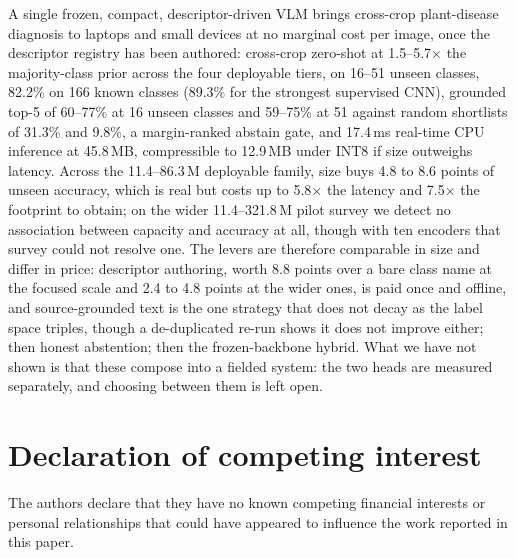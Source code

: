 \documentclass[a4paper,fleqn]{cas-dc}
\begin{document}
A single frozen, compact, descriptor-driven VLM brings cross-crop plant-disease diagnosis to laptops
and small devices at no marginal cost per image, once the descriptor registry has been authored:
cross-crop zero-shot at 1.5--5.7$\times$ the majority-class prior across the four deployable tiers,
on 16--51 unseen classes, 82.2\% on 166 known classes (89.3\% for the strongest supervised CNN),
grounded top-5 of 60--77\% at 16 unseen classes and 59--75\% at 51 against random shortlists of
31.3\% and 9.8\%, a margin-ranked abstain gate,
and 17.4\,ms real-time CPU inference at 45.8\,MB, compressible to 12.9\,MB under INT8 if size
outweighs latency. Across the 11.4--86.3\,M deployable family, size buys 4.8 to 8.6 points of unseen accuracy, which is real but costs up to 5.8$\times$ the latency and 7.5$\times$ the footprint to obtain; on the wider 11.4--321.8\,M pilot survey we detect no association between capacity and accuracy at all, though with ten encoders that survey could not resolve one. The levers are therefore comparable in size and differ in price: descriptor authoring, worth 8.8 points over a bare class name at the focused scale and 2.4 to 4.8 points at the wider ones, is paid once and offline, and source-grounded text is the one strategy that does not decay as the label space triples, though a de-duplicated re-run shows it does not improve either; then honest abstention; then the frozen-backbone hybrid.
What we have not shown is that these compose into a fielded system: the two heads are measured
separately, and choosing between them is left open.



\printcredits

\section*{Declaration of competing interest}
The authors declare that they have no known competing financial interests or personal relationships
that could have appeared to influence the work reported in this paper.
\end{document}
